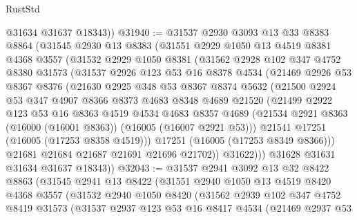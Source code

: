 \begin{lexlean}{RustStd}
\begin{coremodule}
        @31634
        @31637
        @18343))
@31940 := @31537
    @2930
    @3093
    @13
    @33
    @8383
    @8864
    (@31545
      @2930
      @13
      @8383
      (@31551
        @2929
        @1050
        @13
        @4519
        @8381
        @4368
        @3557
        (@31532
          @2929
          @1050
          @8381
          (@31562
            @2928
            @102
            @347
            @4752
            @8380
            @31573
            (@31537
              @2926
              @123
              @53
              @16
              @8378
              @4534
              (@21469
                @2926
                @53
                @8367
                @8376
                (@21630
                  @2925
                  @348
                  @53
                  @8367
                  @8374
                  @5632
                  (@21500
                    @2924
                    @53
                    @347
                    @4907
                    @8366
                    @8373
                    @4683
                    @8348
                    @4689
                    @21520
                    (@21499
                      @2922
                      @123
                      @53
                      @16
                      @8363
                      @4519
                      @4534
                      @4683
                      @8357
                      @4689
                      (@21534 @2921 @8363 (@16000 (@16001 @8363)) (@16005 (@16007 @2921 @53)))
                      @21541
                      @17251
                      (@16005 (@17253 @8358 @4519)))
                    @17251
                    (@16005 (@17253 @8349 @8366)))
                  @21681
                  @21684
                  @21687
                  @21691
                  @21696
                  @21702))
              @31622)))
        @31628
        @31631
        @31634
        @31637
        @18343))
@32043 := @31537
    @2941
    @3092
    @13
    @32
    @8422
    @8863
    (@31545
      @2941
      @13
      @8422
      (@31551
        @2940
        @1050
        @13
        @4519
        @8420
        @4368
        @3557
        (@31532
          @2940
          @1050
          @8420
          (@31562
            @2939
            @102
            @347
            @4752
            @8419
            @31573
            (@31537
              @2937
              @123
              @53
              @16
              @8417
              @4534
              (@21469
                @2937
                @53

\end{coremodule}
\end{lexlean}
